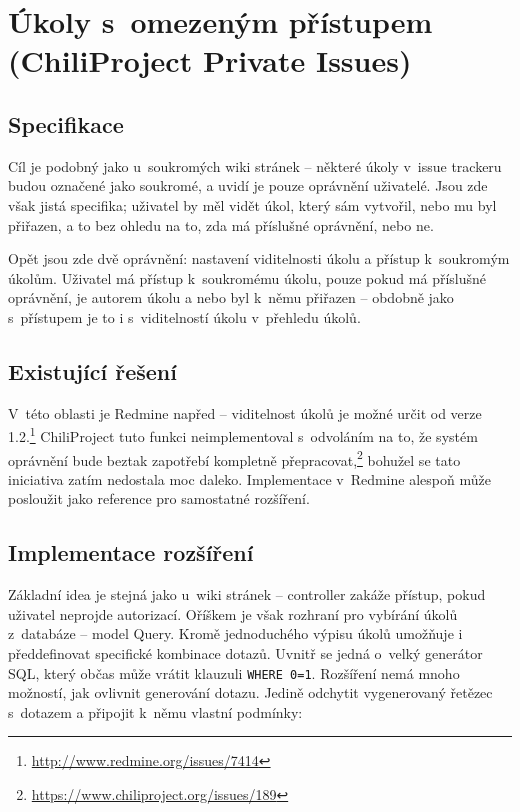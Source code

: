 \documentclass[thesis=B,czech]{FITthesis}[2012/05/02]
\begin{document}
\section[Úkoly s~omezeným přístupem]{Úkoly s~omezeným přístupem (ChiliProject Private Issues)}
\label{sec:private_issues}

\subsection{Specifikace}

Cíl je podobný jako u~soukromých wiki stránek -- některé úkoly v~issue
trackeru budou označené jako soukromé, a uvidí je pouze oprávnění
uživatelé. Jsou zde však jistá specifika; uživatel by měl vidět úkol,
který sám vytvořil, nebo mu byl přiřazen, a to bez ohledu na to,
zda má příslušné oprávnění, nebo ne.

Opět jsou zde dvě oprávnění: nastavení viditelnosti úkolu a přístup
k~soukromým úkolům. Uživatel má přístup k~soukromému úkolu, pouze pokud má
příslušné oprávnění, je autorem úkolu a nebo byl k~němu přiřazen --
obdobně jako s~přístupem je to i s~viditelností úkolu v~přehledu úkolů.

\subsection{Existující řešení}
\label{sec:private_issues_exist}

V~této oblasti je Redmine napřed -- viditelnost úkolů je možné určit od
verze 1.2.\footnote{\url{http://www.redmine.org/issues/7414}}
ChiliProject tuto funkci neimplementoval s~odvoláním na to, že systém
oprávnění bude beztak zapotřebí kompletně přepracovat,\footnote{\url{https://www.chiliproject.org/issues/189}}
bohužel se tato iniciativa zatím nedostala moc daleko. Implementace
v~Redmine alespoň může posloužit jako reference pro samostatné
rozšíření.

\subsection{Implementace rozšíření}

Základní idea je stejná jako u~wiki stránek -- controller zakáže přístup,
pokud uživatel neprojde autorizací. Oříškem je však rozhraní pro
vybírání úkolů z~databáze -- model Query. Kromě jednoduchého výpisu
úkolů umožňuje i předdefinovat specifické kombinace dotazů. Uvnitř se
jedná o~velký generátor SQL, který občas může vrátit klauzuli
\lstinline!WHERE 0=1!. Rozšíření nemá mnoho možností, jak ovlivnit
generování dotazu. Jedině odchytit vygenerovaný řetězec
s~dotazem a připojit k~němu vlastní podmínky:
\end{document}
